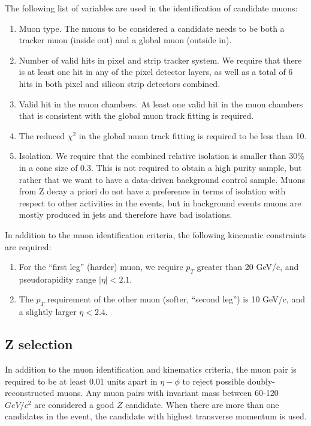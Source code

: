 \documentclass{cmspaper}
\begin{document}
The following list of variables are used in the identification of
candidate muons:

\begin{enumerate}
\item Muon type.  The muons to be considered a candidate needs to be
  both a tracker muon (inside out) and a global muon (outside in).
\item Number of valid hits in pixel and strip tracker system.  We
  require that there is at least one hit in any of the pixel detector
  layers, as well as a total of 6 hits in both pixel and silicon strip
  detectors combined.
\item Valid hit in the muon chambers.  At least one valid hit in the
  muon chambers that is consistent with the global muon track fitting
  is required.
\item The reduced $\chi^2$ in the global muon track fitting is
  required to be less than 10.
\item Isolation.  We require that the combined relative isolation is
  smaller than 30\% in a cone size of 0.3.  This is not required to
  obtain a high purity sample, but rather that we want to have a
  data-driven background control sample.  Muons from Z decay a priori
  do not have a preference in terms of isolation with respect to other
  activities in the events, but in background events muons are mostly
  produced in jets and therefore have bad isolations.
\end{enumerate}

In addition to the muon identification criteria, the following
kinematic constraints are required:

\begin{enumerate}
\item For the ``first leg'' (harder) muon, we require $p_T$ greater
  than 20 GeV/c, and pseudorapidity range $|\eta|<2.1$.
\item The $p_T$ requirement of the other muon (softer, ``second leg'')
  is 10 GeV/c, and a slightly larger $\eta<2.4$.
\end{enumerate}

\subsection{Z selection}

In addition to the muon identification and kinematics criteria, the
muon pair is required to be at least 0.01 units apart in $\eta-\phi$
to reject possible doubly-reconstructed muons. Any muon pairs with
invariant mass between 60-120 $GeV/c^2$ are considered a good $Z$
candidate.  When there are more than one candidates in the event, the
candidate with highest transverse momentum is used.
\end{document}

